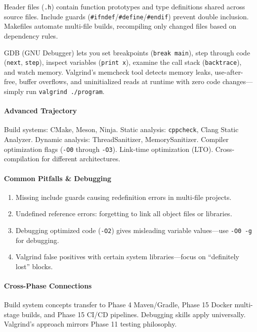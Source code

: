 \documentclass[11pt, a4paper, oneside]{report}
\begin{document}
Header files (\texttt{.h}) contain function prototypes and type definitions shared across source files. Include guards (\texttt{\#ifndef}/\texttt{\#define}/\texttt{\#endif}) prevent double inclusion. Makefiles automate multi-file builds, recompiling only changed files based on dependency rules.

GDB (GNU Debugger) lets you set breakpoints (\texttt{break main}), step through code (\texttt{next}, \texttt{step}), inspect variables (\texttt{print x}), examine the call stack (\texttt{backtrace}), and watch memory. Valgrind's memcheck tool detects memory leaks, use-after-free, buffer overflows, and uninitialized reads at runtime with zero code changes---simply run \texttt{valgrind ./program}.

\paragraph{Advanced Trajectory} Build systems: CMake, Meson, Ninja. Static analysis: \texttt{cppcheck}, Clang Static Analyzer. Dynamic analysis: ThreadSanitizer, MemorySanitizer. Compiler optimization flags (\texttt{-O0} through \texttt{-O3}). Link-time optimization (LTO). Cross-compilation for different architectures.

\paragraph{Common Pitfalls \& Debugging}
\begin{enumerate}[leftmargin=*]
\item Missing include guards causing redefinition errors in multi-file projects.
\item Undefined reference errors: forgetting to link all object files or libraries.
\item Debugging optimized code (\texttt{-O2}) gives misleading variable values---use \texttt{-O0 -g} for debugging.
\item Valgrind false positives with certain system libraries---focus on ``definitely lost'' blocks.
\end{enumerate}

\paragraph{Cross-Phase Connections} Build system concepts transfer to Phase 4 Maven/Gradle, Phase 15 Docker multi-stage builds, and Phase 15 CI/CD pipelines. Debugging skills apply universally. Valgrind's approach mirrors Phase 11 testing philosophy.
\end{document}
